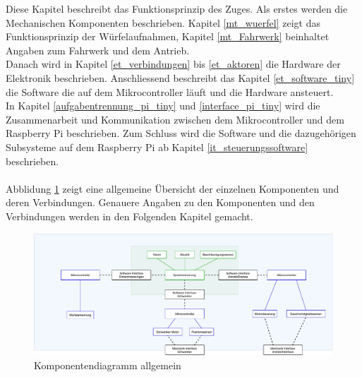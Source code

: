 \documentclass[../../main.tex]{subfiles}
\begin{document}

Diese Kapitel beschreibt das Funktionsprinzip des Zuges. Als erstes werden die Mechanischen Komponenten beschrieben. Kapitel \ref{mt_wuerfel} zeigt das Funktionsprinzip der Würfelaufnahmen, Kapitel \ref{mt_Fahrwerk} beinhaltet Angaben zum Fahrwerk und dem Antrieb. \\
Danach wird in Kapitel \ref{et_verbindungen} bis \ref{et_aktoren} die Hardware der Elektronik beschrieben. Anschliessend beschreibt das Kapitel \ref{et_software_tiny} die Software die auf dem Mikrocontroller läuft und die Hardware ansteuert. \\
In Kapitel \ref{aufgabentrennung_pi_tiny} und \ref{interface_pi_tiny} wird die Zusammenarbeit und Kommunikation zwischen dem Mikrocontroller und dem Raspberry Pi beschrieben.
Zum Schluss wird die Software und die dazugehörigen Subsysteme auf dem Raspberry Pi ab Kapitel \ref{it_steuerungssoftware} beschrieben.\\
\\
Abblidung \ref{fig:komponenten_allg} zeigt eine allgemeine Übersicht der einzelnen Komponenten und deren Verbindungen. Genauere Angaben zu den Komponenten und den Verbindungen werden in den Folgenden Kapitel gemacht.\\

\begin{figure}[H]
    \centering
    \includegraphics[width=1.0\textwidth]{../../images/Komponentendiagramm/Komponentendiagramm.pdf}
    \caption {Komponentendiagramm allgemein}
    \label{fig:komponenten_allg}
\end{figure}
\end{document}
